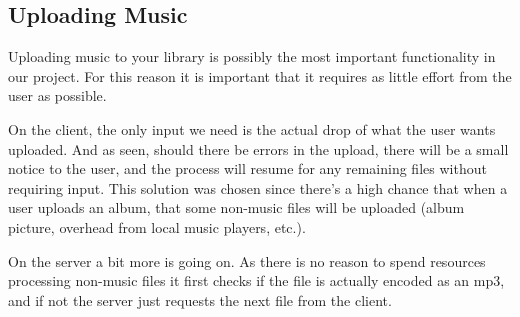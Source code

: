 \subsection{Uploading Music}

\noindent{}

Uploading music to your library is possibly the most important functionality in our project. For this reason it is important that
it requires as little effort from the user as possible.

On the client, the only input we need is the actual drop of what the user wants uploaded. And as seen, should there be errors in the
upload, there will be a small notice to the user, and the process will resume for any remaining files without requiring input. This
solution was chosen since there's a high chance that when a user uploads an album, that some non-music files will be uploaded (album
 picture, overhead from local music players, etc.).

On the server a bit more is going on. As there is no reason to spend resources processing non-music files it first checks if the file is
actually encoded as an mp3, and if not the server just requests the next file from the client.

